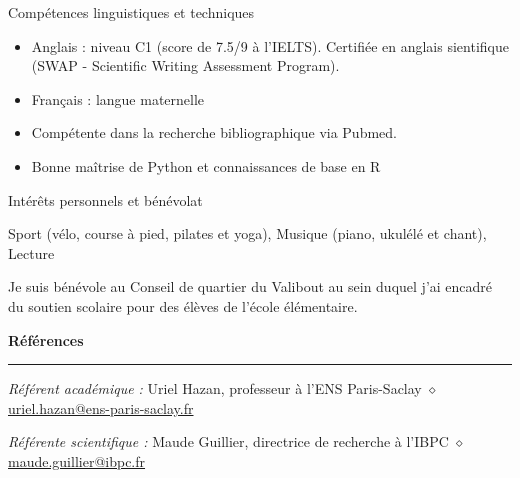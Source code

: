 \documentclass[
	10pt,
]{style} %
\renewenvironment{rReferences}
{\vspace{-0.25em}\medskip\textbf{Références}\medskip\hrule
\begin{list}{}
{\setlength{\leftmargin}{1.5em}
\setlength{\labelwidth}{0pt}
\setlength{\itemindent}{0pt}
\setlength{\labelsep}{0pt}
\setlength{\parsep}{0pt}
\setlength{\topsep}{0.3em}
\setlength{\itemsep}{0.3em}}}
{\end{list}}
\begin{document}

	\begin{rSection}{Compétences linguistiques et techniques}

	\begin{itemize}[noitemsep, topsep=0pt, left=0pt]
		\item Anglais : niveau C1 (score de 7.5/9 à l'IELTS). Certifiée en anglais sientifique (SWAP - Scientific Writing Assessment Program).
		\item Français : langue maternelle
		\item Compétente dans la recherche bibliographique via Pubmed.
		\item Bonne maîtrise de Python et connaissances de base en R
	\end{itemize}

	\end{rSection}



	\begin{rSection}{Intérêts personnels et bénévolat}
	\vspace{-1em}
	\begin{rSubsection}{}{}{}{}
		\item Sport (vélo, course à pied, pilates et yoga), Musique (piano, ukulélé et chant), Lecture
		\item Je suis bénévole au Conseil de quartier du Valibout au sein duquel j'ai encadré du soutien scolaire pour des élèves de l'école élémentaire.
	\end{rSubsection}

	\end{rSection}



	\begin{rReferences}
		\item \textit{Référent académique :} Uriel Hazan, professeur à l'ENS Paris-Saclay $\diamond$ \href{mailto:uriel.hazan@ens-paris-saclay.fr}{uriel.hazan@ens-paris-saclay.fr}
		\item \textit{Référente scientifique :} Maude Guillier, directrice de recherche à l'IBPC $\diamond$ \href{mailto:maude.guillier@ibpc.fr}{maude.guillier@ibpc.fr}
	\end{rReferences}
\end{document}
